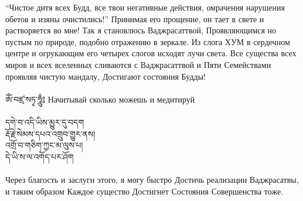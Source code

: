 “Чистое дитя всех Будд, все твои негативные действия, омрачения
нарушения обетов и изяны очистились!”
Принимая его прощение, он тает в свете и растворяется во мне!
Так я становлюсь Ваджрасаттвой,
Проявляющимся но пустым по природе, подобно отражению в зеркале.
Из слога ХУМ в сердечном центре и огрукающим его четырех слогов исходят лучи света. Все существа всех миров и всех вселенных
сливаются с Ваджрасаттвой и Пяти Семействами проявляя чистую мандалу, Достигают состояния Будды!\\
\\
\ti
ཨོཾ་བཛྲ་སཏྭ་ཧཱུྂ༔ \ru Начитывай сколько можешь и медитируй\\
\\
\ti
དགེ་བ་འདི་ཡིས་མྱུར་དུ་བདག \\
རྡོ་རྗེ་སེམས་དཔའ་འགྲུབ་གྱུར་ནས། \\
འགྲོ་བ་གཅིག་ཀྱང་མ་ལུས་པ། \\
དེ་ཡི་ས་ལ་འགོད་པར་ཤོག\\
\\
\ru
Через благость и заслуги этого, я могу быстро Достичь реализации Ваджрасатвы, и таким образом Каждое существо
Достигнет Состояния Совершенства тоже.



